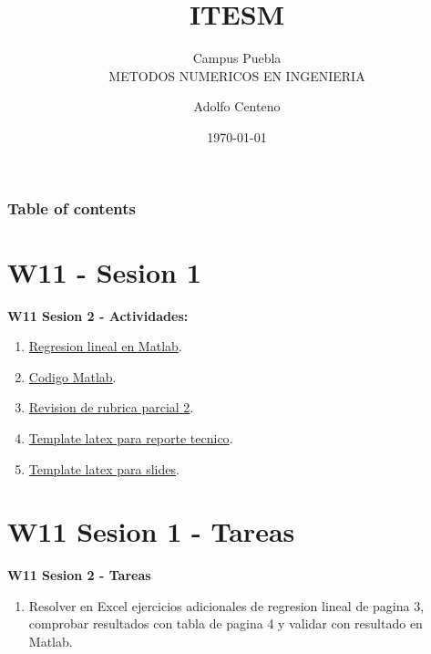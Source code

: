 \documentclass{beamer}
\begin{document}
\title{ITESM}  
\subtitle{Campus Puebla\\METODOS NUMERICOS EN INGENIERIA
}
\author{Adolfo Centeno}
\date{\today} 


\begin{frame}
\titlepage
\end{frame}

\begin{frame}\frametitle{Table of contents}
\tableofcontents
\end{frame} 


\section{W11 - Sesion 1 }

\begin{frame}

\textbf{W11 Sesion 2 - Actividades:}

\begin{enumerate}
\item
	 \href{https://la.mathworks.com/help/matlab/data_analysis/linear-regression.html?lang=en}{Regresion lineal en Matlab}.

\item
	 \href{https://github.com/adsoftsito/metodos-numericos/tree/master/w11/reglineal}{Codigo Matlab}.

\item
	 \href{https://github.com/adsoftsito/metodos-numericos/tree/master/w11/reglineal}{Revision de rubrica parcial 2}.

\item
	 \href{https://github.com/adsoftsito/metodos-numericos/tree/master/w11/reglineal}{Template latex para reporte tecnico}.

\item
	 \href{https://github.com/adsoftsito/metodos-numericos/tree/master/w11/reglineal}{Template latex para slides}.

\end{enumerate} 

\end{frame}


\section{W11 Sesion 1 - Tareas }

\begin{frame}


\textbf{W11 Sesion 2 - Tareas}


\begin{enumerate}
\item

Resolver en Excel ejercicios adicionales de regresion lineal de pagina 3, comprobar resultados con tabla de pagina 4 y
validar con resultado en Matlab.


\end{enumerate} 


\end{frame}
\end{document}
